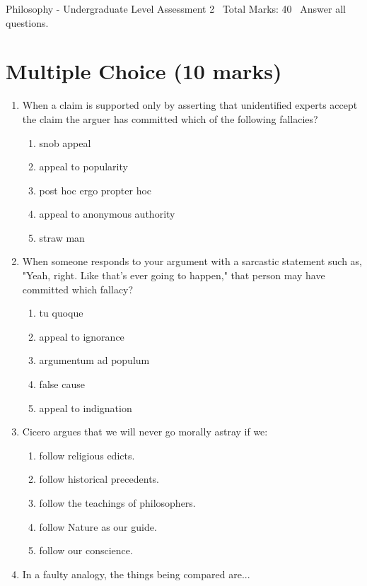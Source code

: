 \documentclass[12pt]{article}
\begin{document}
\begin{center}
Philosophy - Undergraduate Level Assessment 2 \
Total Marks: 40 \
Answer all questions.
\end{center}

\section*{Multiple Choice (10 marks)}
\begin{enumerate}[label=\arabic*.]
\item When a claim is supported only by asserting that unidentified experts accept the claim the
arguer has committed which of the following fallacies?
\begin{enumerate}[label=(\alph*)]
    \item snob appeal
    \item appeal to popularity
    \item post hoc ergo propter hoc
    \item appeal to anonymous authority
    \item straw man
\end{enumerate}
\item When someone responds to your argument with a sarcastic statement such as, "Yeah, right.
Like that's ever going to happen," that person may have committed which fallacy?
\begin{enumerate}[label=(\alph*)]
    \item tu quoque
    \item appeal to ignorance
    \item argumentum ad populum
    \item false cause
    \item appeal to indignation
\end{enumerate}
\item Cicero argues that we will never go morally astray if we:
\begin{enumerate}[label=(\alph*)]
    \item follow religious edicts.
    \item follow historical precedents.
    \item follow the teachings of philosophers.
    \item follow Nature as our guide.
    \item follow our conscience.
\end{enumerate}
\item In a faulty analogy, the things being compared are...
\begin{enumerate}[label=(\alph*)]

\end{enumerate}
\end{enumerate}
\end{document}
